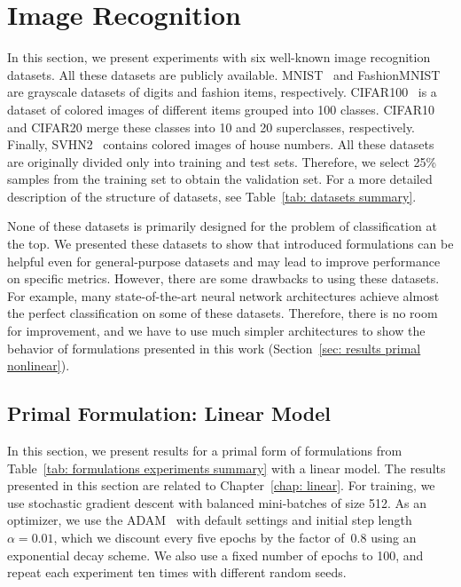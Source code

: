 \section{Image Recognition}

In this section, we present experiments with six well-known image recognition datasets. All these datasets are publicly available. MNIST~\cite{deng2012mnist} and FashionMNIST~\cite{xiao2017fashionmnist} are grayscale datasets of digits and fashion items, respectively. CIFAR100~\cite{krizhevsky2009learning} is a dataset of colored images of different items grouped into 100 classes. CIFAR10 and CIFAR20 merge these classes into 10 and 20 superclasses, respectively. Finally, SVHN2~\cite{netzer2011reading} contains colored images of house numbers. All these datasets are originally divided only into training and test sets. Therefore, we select 25\% samples from the training set to obtain the validation set. For a more detailed description of the structure of datasets, see Table~\ref{tab: datasets summary}.

None of these datasets is primarily designed for the problem of classification at the top. We presented these datasets to show that introduced formulations can be helpful even for general-purpose datasets and may lead to improve performance on specific metrics. However, there are some drawbacks to using these datasets. For example, many state-of-the-art neural network architectures achieve almost the perfect classification on some of these datasets. Therefore, there is no room for improvement, and we have to use much simpler architectures to show the behavior of formulations presented in this work (Section~\ref{sec: results primal nonlinear}).


\subsection{Primal Formulation: Linear Model}\label{sec: results primal linear}

In this section, we present results for a primal form of formulations from Table~\ref{tab: formulations experiments summary} with a linear model. The results presented in this section are related to Chapter~\ref{chap: linear}. For training, we use stochastic gradient descent with balanced mini-batches of size 512. As an optimizer, we use the ADAM~\cite{kingma2014adam} with default settings and initial step length~$\alpha = 0.01$, which we discount every five epochs by the factor of~$0.8$ using an exponential decay scheme. We also use a fixed number of epochs to 100, and repeat each experiment ten times with different random seeds.

